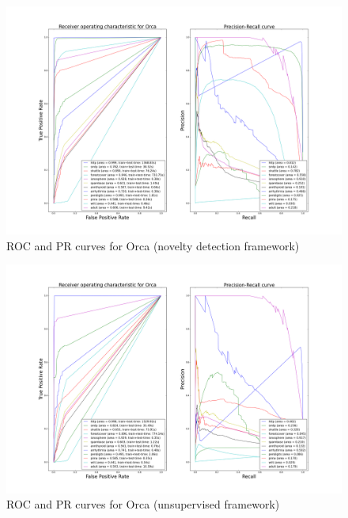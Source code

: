 \begin{figure}[!ht]
  \caption{ROC and PR curves for Orca (novelty detection framework)}
  \label{ocrf:fig:orca_roc_pr}
  \centering
  \includegraphics[trim=175 80 175 123, clip, width=\linewidth]{fig_source/ocrf_fig/bench_orca_roc_pr_supervised_factorized.png}
\end{figure}
\begin{figure}[!ht]
  \caption{ROC and PR curves for Orca (unsupervised framework)}
  \label{ocrf:fig:orca_roc_pr_unsupervised}
  \centering
  \includegraphics[trim=175 80 175 123, clip, width=\linewidth]{fig_source/ocrf_fig/bench_orca_roc_pr_unsupervised_factorized.png}
\end{figure}

